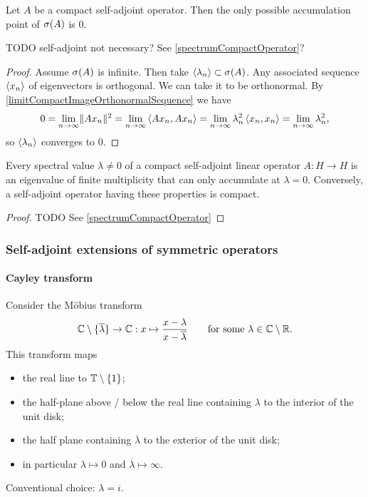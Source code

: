 \begin{proposition}
Let $A$ be a compact self-adjoint operator. Then the only possible accumulation point of $\sigma(A)$ is $0$.
\end{proposition}
TODO self-adjoint not necessary? See \ref{spectrumCompactOperator}?
\begin{proof}
Assume $\sigma(A)$ is infinite. Then take $\left\langle \lambda_n \right\rangle\subset \sigma(A)$. Any associated sequence $\left\langle x_n \right\rangle$ of eigenvectors is orthogonal. We can take it to be orthonormal. By \ref{limitCompactImageOrthonormalSequence} we have
\[ 0 = \lim_{n\to\infty} \lVert Ax_n\rVert^2 = \lim_{n\to\infty}\left\langle Ax_n,Ax_n \right\rangle = \lim_{n\to\infty}\lambda_n^2\left\langle x_n,x_n \right\rangle = \lim_{n\to\infty}\lambda_n^2, \]
so $\left\langle \lambda_n \right\rangle$ converges to $0$.
\end{proof}

\begin{theorem}
Every spectral value $\lambda\neq 0$ of a compact self-adjoint linear
operator $A : H \to H$ is an eigenvalue of finite multiplicity that can only
accumulate at $\lambda = 0$. Conversely, a self-adjoint operator having these
properties is compact.
\end{theorem}
\begin{proof}
TODO See \ref{spectrumCompactOperator}
\end{proof}

\subsubsection{Self-adjoint extensions of symmetric operators}
\paragraph{Cayley transform}
Consider the Möbius transform
\[ \mathbb{C}\setminus\{\overline{\lambda}\} \to \mathbb{C}: x\mapsto \frac{x - \lambda}{x-\overline{\lambda}} \qquad \text{for some $\lambda\in\mathbb{C}\setminus\mathbb{R}$.} \]
This transform maps
\begin{itemize}
\item the real line to $\mathbb{T}\setminus\{1\}$;
\item the half-plane above / below the real line containing $\lambda$ to the interior of the unit disk;
\item the half plane containing $\overline{\lambda}$ to the exterior of the unit disk;
\item in particular $\lambda \mapsto 0$ and $\overline{\lambda} \mapsto \infty$.
\end{itemize}
Conventional choice: $\lambda = i$.

